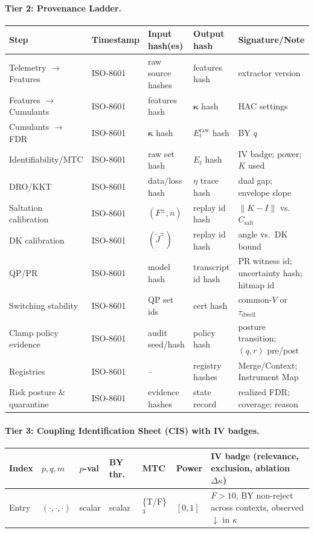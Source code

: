 \documentclass[10pt]{article}
\newcommand{\cutq}{q}
\begin{document}
\paragraph{Tier 2: Provenance Ladder.}
\begin{center}
\renewcommand{\arraystretch}{1.12}
\begin{tabularx}{\textwidth}{@{} l l X X X @{}}
\toprule
\textbf{Step} & \textbf{Timestamp} & \textbf{Input hash(es)} & \textbf{Output hash} & \textbf{Signature/Note} \\
\midrule
Telemetry $\to$ Features & ISO-8601 & raw source hashes & features hash & extractor version \\
Features $\to$ Cumulants & ISO-8601 & features hash & $\bm\kappa$ hash & HAC settings \\
Cumulants $\to$ FDR & ISO-8601 & $\bm\kappa$ hash & $E_t^{\mathrm{raw}}$ hash & BY $\cutq$ \\
Identifiability/MTC & ISO-8601 & raw set hash & $E_t$ hash & IV badge; power; $K$ used \\
DRO/KKT & ISO-8601 & data/loss hash & $\eta$ trace hash & dual gap; envelope slope \\
Saltation calibration & ISO-8601 & $(F^\pm,n)$ & replay id hash & $\|K{-}I\|$ vs.\ $C_{\mathrm{salt}}$ \\
DK calibration & ISO-8601 & $(\widetilde J^\pm)$ & replay id hash & angle vs.\ DK bound \\
QP/PR & ISO-8601 & model hash & transcript id hash & PR witness id; uncertainty hash; hitmap id \\
Switching stability & ISO-8601 & QP set ids & cert hash & common-$V$ or $\tau_{\mathrm{dwell}}$ \\
Clamp policy evidence & ISO-8601 & audit seed/hash & policy hash & posture transition; $(\cutq,r)$ pre/post \\
Registries & ISO-8601 & – & registry hashes & Merge/Context; Instrument Map \\
Risk posture \& quarantine & ISO-8601 & evidence hashes & state record & realized FDR; coverage; reason \\
\bottomrule
\end{tabularx}
\end{center}

\paragraph{Tier 3: Coupling Identification Sheet (CIS) with IV badges.}
\begin{center}
\renewcommand{\arraystretch}{1.12}
\begin{tabularx}{\textwidth}{@{} l l l l l l X @{}}
\toprule
\textbf{Index} & \textbf{$p,q,m$} & \textbf{$p$-val} & \textbf{BY thr.} & \textbf{MTC} & \textbf{Power} & \textbf{IV badge (relevance, exclusion, ablation $\Delta\kappa$)} \\
\midrule
Entry & $(\cdot,\cdot,\cdot)$ & scalar & scalar & \{T/F\}$^3$ & $[0,1]$ & $F{>}10$, BY non-reject across contexts, observed $\downarrow$ in $\kappa$ \\
\bottomrule
\end{tabularx}
\end{center}
\end{document}
